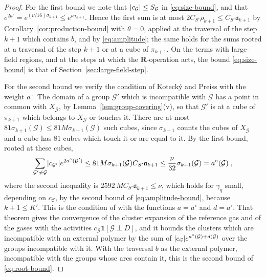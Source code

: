 \documentclass[11pt]{preprint}
\DeclarePairedDelimiter{\abs}{\lvert}{\rvert}
\numberwithin{equation}{section}
\theoremstyle{definition}
\theoremstyle{remark}
\theoremstyle{plain}
\begin{document}
\begin{proof}
For the first bound we note that $\abs{c_{\mathcal G}} \leq S_{\mathcal G}$ in \eqref{eq:size-bound}, and that $e^{2a^\circ} = e^{(\nu/16)\sigma_{k+1}} \leq e^{\nu\sigma_{k+1}}$. Hence the first sum is at most $2C_{S'}\rho_{k+1} \leq C_{S'}\mathfrak a_{k+1}$ by Corollary~\ref{cor:production-bound} with $\theta = 0$, applied at the traversal of the step $k + 1$ which contains $b$, and by \eqref{eq:amplitude}; the same holds for the sums rooted at a traversal of the step $k + 1$ or at a cube of $\pi_{k+1}$. On the terms with large-field regions, and at the steps at which the $\mathbf R$-operation acts, the bound \eqref{eq:size-bound} is that of Section~\ref{sec:large-field-step}.

For the second bound we verify the condition of Koteck\'y and Preiss with the weight $a^\circ$. The domain of a group $\mathcal G'$ which is incompatible with $\mathcal G$ has a point in common with $X_{\mathcal G}$, by Lemma~\ref{lem:group-covering}(v), so that $\mathcal G'$ is at a cube of $\pi_{k+1}$ which belongs to $X_{\mathcal G}$ or touches it. There are at most $81\sigma_{k+1}(\mathcal G) \leq 81M\sigma_{k+1}(\mathcal G)$ such cubes, since $\sigma_{k+1}$ counts the cubes of $X_{\mathcal G}$ and a cube has $81$ cubes which touch it or are equal to it. By the first bound, rooted at these cubes,
\begin{equation}\label{eq:kp-condition}
    \sum_{\mathcal G' \not\sim \mathcal G}\abs{c_{\mathcal G'}}e^{2a^\circ(\mathcal G')} \leq 81M\sigma_{k+1}(\mathcal G)C_{S'}\mathfrak a_{k+1} \leq \frac{\nu}{32}\sigma_{k+1}(\mathcal G) = a^\circ(\mathcal G)\;,
\end{equation}
where the second inequality is $2592\,MC_{S'}\mathfrak a_{k+1} \leq \nu$, which holds for $\gamma_q$ small, depending on $c_{\mathcal C}$, by the second bound of \eqref{eq:amplitude-bound}, because $k + 1 \leq K'$. This is the condition of \cite[Theorem~5.4]{FriedliVelenik} with the functions $a = a^\circ$ and $d = a^\circ$. That theorem gives the convergence of the cluster expansion of the reference gas and of the gases with the activities $c_{\mathcal G}\mathbf 1[\mathcal G \perp D]$, and it bounds the clusters which are incompatible with an external polymer by the sum of $\abs{c_{\mathcal G}}e^{a^\circ(\mathcal G) + d(\mathcal G)}$ over the groups incompatible with it. With the traversal $b$ as the external polymer, incompatible with the groups whose arcs contain it, this is the second bound of \eqref{eq:root-bound}.


\end{proof}
\end{document}
